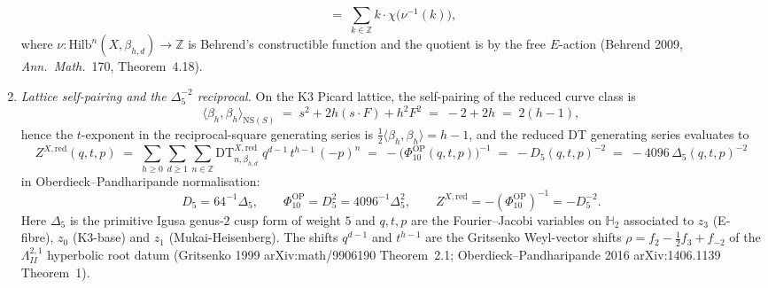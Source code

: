 \begin{proposition}
\begin{enumerate}
\[ \;=\; \sum_{k\in\mathbb Z} k\cdot\chi\bigl(\nu^{-1}(k)\bigr),
\]
where $\nu:\mathrm{Hilb}^n(X,\beta_{h,d})\to\mathbb Z$ is Behrend's
constructible function and the quotient is by the free $E$-action
(Behrend 2009, \emph{Ann.\ Math.}~170, Theorem~4.18).
\item \emph{Lattice self-pairing and the $\Delta_5^{-2}$ reciprocal.}
On the K3 Picard lattice, the self-pairing of the reduced curve class
is
\[
 \langle\beta_h,\beta_h\rangle_{\mathrm{NS}(S)}
 \;=\; s^2 + 2h(s\cdot F) + h^2 F^2
 \;=\; -2 + 2h \;=\; 2(h-1),
\]
hence the $t$-exponent in the reciprocal-square generating series is
$\tfrac12\langle\beta_h,\beta_h\rangle = h-1$, and the reduced DT
generating series evaluates to
\[
 Z^{X,\mathrm{red}}(q,t,p)
 \;=\; \sum_{h\ge 0}\sum_{d\ge 1}\sum_{n\in\mathbb Z}
 \mathrm{DT}^{X,\mathrm{red}}_{n,\beta_{h,d}}\;
 q^{d-1}\, t^{h-1}\, (-p)^n
 \;=\; -\bigl(\Phi_{10}^{\mathrm{OP}}(q,t,p)\bigr)^{-1}
 \;=\; -D_5(q,t,p)^{-2}
 \;=\; -4096\,\Delta_5(q,t,p)^{-2}
\]
in Oberdieck--Pandharipande normalisation:
\[
 D_5=64^{-1}\Delta_5,\qquad
 \Phi_{10}^{\mathrm{OP}}=D_5^2=4096^{-1}\Delta_5^2,\qquad
 Z^{X,\mathrm{red}}=-(\Phi_{10}^{\mathrm{OP}})^{-1}=-D_5^{-2}.
\]
Here $\Delta_5$ is the primitive Igusa genus-$2$ cusp form of
weight $5$ and $q,t,p$ are the Fourier--Jacobi variables on
$\mathbb H_2$ associated to $z_3$ (E-fibre), $z_0$ (K3-base) and
$z_1$ (Mukai-Heisenberg). The shifts $q^{d-1}$ and $t^{h-1}$ are the
Gritsenko Weyl-vector shifts
$\rho = f_2 - \tfrac12 f_3 + f_{-2}$ of the $\Lambda^{2,1}_{II}$
hyperbolic root datum (Gritsenko 1999 arXiv:math/9906190 Theorem~2.1;
Oberdieck--Pandharipande 2016 arXiv:1406.1139 Theorem~1).
\end{enumerate}
\end{proposition}

